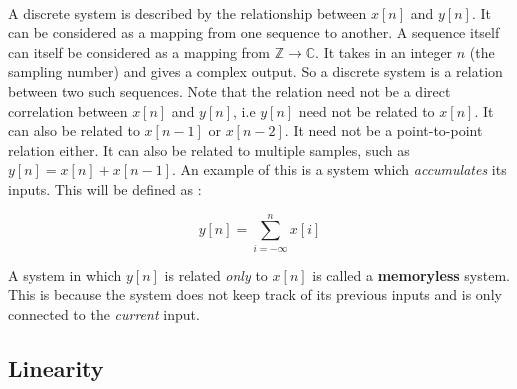 \documentclass{article}
\theoremstyle{definition}
\begin{document}
 \\

A discrete system is described by the relationship between $x[n]$ and $y[n]$. It can be considered as a mapping from one sequence to another. A sequence itself can itself be considered as a mapping from $\mathbb{Z} \rightarrow \mathbb{C}$. It takes in an integer $n$ (the sampling number) and gives a complex output. So a discrete system is a relation between two such sequences. Note that the relation need not be a direct correlation between $x[n]$ and $y[n]$, i.e $y[n]$ need not be related to $x[n]$. It can also be related to $x[n-1]$ or $x[n-2]$. It need not be a point-to-point relation either. It can also be related to multiple samples, such as $y[n] = x[n] + x[n-1]$. An example of this is a system which \textit{accumulates} its inputs. This will be defined as :

\[ 
	y[n] = \sum_{i=-\infty}^{n} x[i]
\]

A system in which $y[n]$ is related \textit{only} to $x[n]$ is called a \textbf{memoryless} system. This is because the system does not keep track of its previous inputs and is only connected to the \textit{current} input.


\subsection{Linearity}
\end{document}
